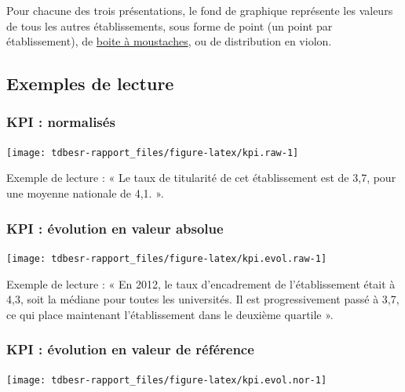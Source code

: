 \documentclass[11pt,french,landscape]{article}
\begin{document}
\begin{multicols}{2}
Pour chacune des trois présentations, le fond de graphique représente
les valeurs de tous les autres établissements, sous forme de point (un
point par établissement), de
\href{https://fr.wikipedia.org/wiki/Bo\%C3\%AEte_\%C3\%A0_moustaches}{boite
à moustaches}, ou de distribution en violon.

\hypertarget{exemples-de-lecture}{%
\subsection{Exemples de lecture}\label{exemples-de-lecture}}

\hypertarget{kpi-normalisuxe9s}{%
\subsubsection{KPI : normalisés}\label{kpi-normalisuxe9s}}

\begin{center}\texttt{[image: tdbesr-rapport\_files/figure-latex/kpi.raw-1]} \end{center}

Exemple de lecture : « Le taux de titularité de cet établissement est de
3,7, pour une moyenne nationale de 4,1. ».

\hypertarget{kpi-uxe9volution-en-valeur-absolue}{%
\subsubsection{KPI : évolution en valeur
absolue}\label{kpi-uxe9volution-en-valeur-absolue}}

\begin{center}\texttt{[image: tdbesr-rapport\_files/figure-latex/kpi.evol.raw-1]} \end{center}

Exemple de lecture : « En 2012, le taux d'encadrement de l'établissement
était à 4,3, soit la médiane pour toutes les universités. Il est
progressivement passé à 3,7, ce qui place maintenant l'établissement
dans le deuxième quartile ».

\hypertarget{kpi-uxe9volution-en-valeur-de-ruxe9fuxe9rence}{%
\subsubsection{KPI : évolution en valeur de
référence}\label{kpi-uxe9volution-en-valeur-de-ruxe9fuxe9rence}}

\begin{center}\texttt{[image: tdbesr-rapport\_files/figure-latex/kpi.evol.nor-1]} \end{center}


\end{multicols}
\end{document}
